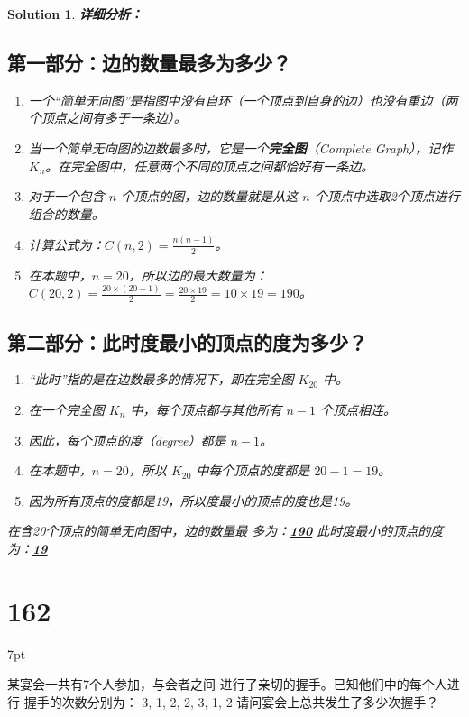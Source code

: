 \documentclass[UTF8]{report}
\newtheorem{solution}{Solution}
\theoremstyle{MyLineTheoremStyle} %
\theoremstyle{MyBlockTheoremStyle} %
\theoremstyle{MySubsubsectionStyle} %
\newenvironment{graybox}{%
        \def\FrameCommand{%
        \hspace{1pt}%
        {\color{gray}\small \vrule width 2pt}%
        {\color{graybox_color}\vrule width 4pt}%
        \colorbox{graybox_color}%
        }%
        \MakeFramed{\advance\hsize-\width\FrameRestore}%
        \noindent\hspace{-4.55pt}%
        \begin{adjustwidth}{}{7pt}%
        \vspace{2pt}\vspace{2pt}%
        }
        {%
        \vspace{2pt}\end{adjustwidth}\endMakeFramed%
        }
\begin{document}
\begin{solution}
\textbf{详细分析：}

\subsection*{第一部分：边的数量最多为多少？}
\begin{enumerate}
    \item 一个“简单无向图”是指图中没有自环（一个顶点到自身的边）也没有重边（两个顶点之间有多于一条边）。
    \item 当一个简单无向图的边数最多时，它是一个\textbf{完全图}（Complete Graph），记作 $K_n$。在完全图中，任意两个不同的顶点之间都恰好有一条边。
    \item 对于一个包含 $n$ 个顶点的图，边的数量就是从这 $n$ 个顶点中选取2个顶点进行组合的数量。
    \item 计算公式为：$C(n, 2) = \frac{n(n-1)}{2}$。
    \item 在本题中，$n=20$，所以边的最大数量为：
    $C(20, 2) = \frac{20 \times (20-1)}{2} = \frac{20 \times 19}{2} = 10 \times 19 = 190$。
\end{enumerate}

\subsection*{第二部分：此时度最小的顶点的度为多少？}
\begin{enumerate}
    \item “此时”指的是在边数最多的情况下，即在完全图 $K_{20}$ 中。
    \item 在一个完全图 $K_n$ 中，每个顶点都与其他所有 $n-1$ 个顶点相连。
    \item 因此，每个顶点的度（degree）都是 $n-1$。
    \item 在本题中，$n=20$，所以 $K_{20}$ 中每个顶点的度都是 $20 - 1 = 19$。
    \item 因为所有顶点的度都是19，所以度最小的顶点的度也是19。
\end{enumerate}

\hrulefill

在含20个顶点的简单无向图中，边的数量最
多为：\underline{\hspace{2cm}\textbf{190}\hspace{2cm}}
此时度最小的顶点的度为：\underline{\hspace{2cm}\textbf{19}\hspace{2cm}}
\end{solution}

\section*{162}
\begin{graybox}
某宴会一共有7个人参加，与会者之间
进行了亲切的握手。已知他们中的每个人进行
握手的次数分别为：
3, 1, 2, 2, 3, 1, 2
请问宴会上总共发生了多少次握手？
\underline{\hspace{2cm}}
\end{graybox}
\end{document}

